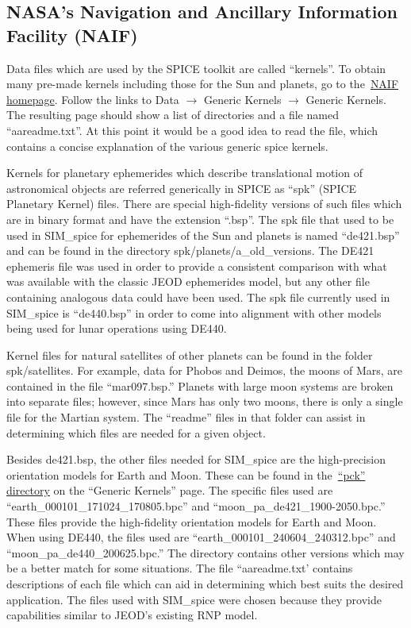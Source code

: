 \subsection {NASA's Navigation and Ancillary Information Facility (NAIF)}
\label{subsec:naif}
Data files which are used by the SPICE toolkit are called ``kernels''.  To
obtain many pre-made kernels including those for the Sun and planets, go to
the~\href{http://naif.jpl.nasa.gov/naif}{NAIF homepage}. Follow the links to
Data $\to$ Generic Kernels $\to$ Generic Kernels.  The resulting page should
show a list of directories and a file named ``aareadme.txt''.  At this point
it would be a good idea to read the file, which contains a concise explanation
of the various generic spice kernels.

Kernels for planetary ephemerides which describe translational motion of
astronomical objects are referred generically in SPICE as ``spk''
(SPICE Planetary Kernel) files. There are special high-fidelity versions of
such files which are in binary format and have the extension ``.bsp''.
The spk file that used to be used in SIM\_spice for ephemerides of the Sun and
planets is named ``de421.bsp'' and can be found in the directory
spk/planets/a\_old\_versions. The DE421 ephemeris file was used in order to
provide a consistent comparison with what was available with the classic JEOD
ephemerides model, but any other file containing analogous data could have
been used. The spk file currently used in SIM\_spice is ``de440.bsp'' in order to
come into alignment with other models being used for lunar operations using DE440.

Kernel files for natural satellites of other planets can be found in the
folder spk/satellites. For example, data for Phobos and Deimos, the moons of
Mars, are contained in the file ``mar097.bsp.''  Planets with large moon
systems are broken into separate files; however, since Mars has only two
moons, there is only a single file for the Martian system. The ``readme''
files in that folder can assist in determining which files are needed for
a given object.

Besides de421.bsp, the other files needed for SIM\_spice are the
high-precision orientation models for Earth and Moon.  These can be found in
the~\href{http://naif.jpl.nasa.gov/pub/naif/generic_kernels/pck}
{``pck'' directory} on the ``Generic Kernels'' page.  The specific files
used are ``earth\_000101\_171024\_170805.bpc'' and
``moon\_pa\_de421\_1900-2050.bpc.'' These files provide the high-fidelity
orientation models for Earth and Moon. When using DE440, the files used are
 ``earth\_000101\_240604\_240312.bpc'' and ``moon\_pa\_de440\_200625.bpc.''
The directory contains other versions which may be a better match for some
situations.  The file ``aareadme.txt' contains descriptions of each file which
can aid in determining which best suits the desired application. The files used
with SIM\_spice were chosen because they provide capabilities similar to JEOD's
existing RNP model.

